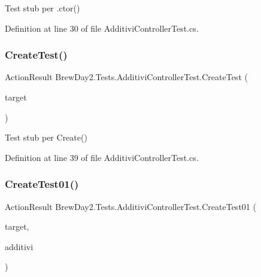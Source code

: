 Test stub per .ctor()



Definition at line 30 of file Additivi\+Controller\+Test.\+cs.

\mbox{\label{class_brew_day2_1_1_tests_1_1_additivi_controller_test_a86b0b3f1428fa6e94164963fbdb6ba85}} 
\subsubsection{\texorpdfstring{Create\+Test()}{CreateTest()}}
{\footnotesize\ttfamily Action\+Result Brew\+Day2.\+Tests.\+Additivi\+Controller\+Test.\+Create\+Test (\begin{DoxyParamCaption}\item[{\mbox{[}\+Pex\+Assume\+Under\+Test\mbox{]} \mbox{\hyperlink{class_brew_day2_1_1_controllers_1_1_additivi_controller}{Additivi\+Controller}}}]{target }\end{DoxyParamCaption})}



Test stub per Create()



Definition at line 39 of file Additivi\+Controller\+Test.\+cs.

\mbox{\label{class_brew_day2_1_1_tests_1_1_additivi_controller_test_a5b5046262654fe2ad7b602ad7fd40e3e}} 
\subsubsection{\texorpdfstring{Create\+Test01()}{CreateTest01()}}
{\footnotesize\ttfamily Action\+Result Brew\+Day2.\+Tests.\+Additivi\+Controller\+Test.\+Create\+Test01 (\begin{DoxyParamCaption}\item[{\mbox{[}\+Pex\+Assume\+Under\+Test\mbox{]} \mbox{\hyperlink{class_brew_day2_1_1_controllers_1_1_additivi_controller}{Additivi\+Controller}}}]{target,  }\item[{\mbox{\hyperlink{class_brew_day2_1_1_models_1_1_additivi}{Additivi}}}]{additivi }\end{DoxyParamCaption})}



